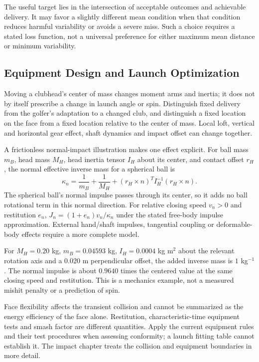 The useful target lies in the intersection of acceptable outcomes and
achievable delivery. It may favor a slightly different mean condition when
that condition reduces harmful variability or avoids a severe miss. Such a
choice requires a stated loss function, not a universal preference for either
maximum mean distance or minimum variability.

\subsection{Equipment Design and Launch Optimization}

Moving a clubhead's center of mass changes moment arms and inertia; it does
not by itself prescribe a change in launch angle or spin. Distinguish fixed
delivery from the golfer's adaptation to a changed club, and distinguish a
fixed location on the face from a fixed location relative to the center of mass.
Local loft, vertical and horizontal gear effect, shaft dynamics and impact
offset can change together.

A frictionless normal-impact illustration makes one effect explicit. For
ball mass $m_B$, head mass $M_H$, head inertia tensor $I_H$ about its center,
and contact offset $r_H$, the normal effective inverse mass for a spherical
ball is
\[
\kappa_n=\frac1{m_B}+\frac1{M_H}
+(r_H\times n)^T I_H^{-1}(r_H\times n).
\]
The spherical ball's normal impulse passes through its center, so it adds no
ball rotational term in this normal direction. For relative closing speed
$v_n>0$ and restitution $e_n$, $J_n=(1+e_n)v_n/\kappa_n$ under the stated
free-body impulse approximation. External hand/shaft impulses, tangential
coupling or deformable-body effects require a more complete model.

For $M_H=0.20$ kg, $m_B=0.04593$ kg, $I_H=0.0004$ kg m$^2$ about the
relevant rotation axis and a 0.020 m perpendicular offset, the added inverse
mass is $1$ kg$^{-1}$. The normal impulse is about $0.9640$ times the
centered value at the same closing speed and restitution. This is a mechanics
example, not a measured mishit penalty or a prediction of spin.

Face flexibility affects the transient collision and cannot be summarized
as the energy efficiency of the face alone. Restitution, characteristic-time
equipment tests and smash factor are different quantities. Apply the current
equipment rules and their test procedures when assessing conformity; a
launch fitting table cannot establish it. The impact chapter treats the
collision and equipment boundaries in more detail.

